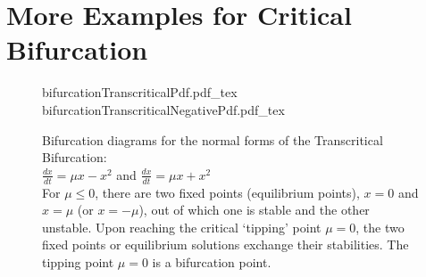 \section{More Examples for Critical Bifurcation}

\begin{figure}[!ht]
	\centering
	\centering
	{bifurcationTranscriticalPdf.pdf_tex}\quad
	{bifurcationTranscriticalNegativePdf.pdf_tex}
	\caption{Bifurcation diagrams for the normal forms of the Transcritical Bifurcation: \\$\frac{dx}{dt} = \mu x - x^2$ and $\frac{dx}{dt} = \mu x + x^2$ \\For $\mu \leq 0$, there are two fixed points (equilibrium points), $x=0$ and $x = \mu$ (or $x = -\mu$), out of which one is stable and the other unstable. Upon reaching the critical `tipping' point $\mu=0$, the two fixed points or equilibrium solutions exchange their stabilities. The tipping point $\mu=0$ is a bifurcation point.}
	\label{fig:bifTranscritical}
\end{figure}